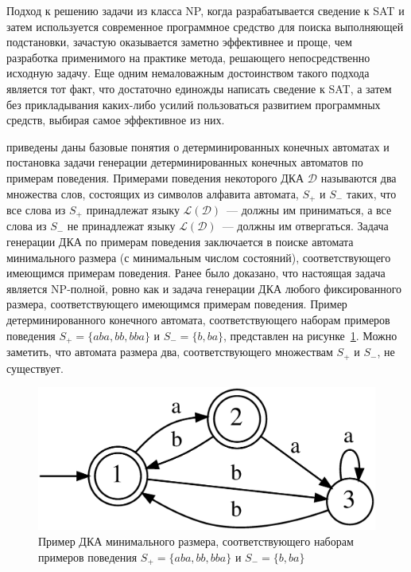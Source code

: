 Подход к решению задачи из класса NP, когда разрабатывается сведение к SAT и затем используется современное программное средство для поиска выполняющей подстановки, зачастую оказывается заметно эффективнее и проще, чем разработка применимого на практике метода, решающего непосредственно исходную задачу.
Еще одним немаловажным достоинством такого подхода является тот факт, что достаточно единожды написать сведение к SAT, а затем без прикладывания каких-либо усилий пользоваться развитием программных средств, выбирая самое эффективное из них.

\insection{\ref{sec:review:dfa-inf}} приведены даны базовые понятия о детерминированных конечных автоматах и постановка задачи генерации детерминированных конечных автоматов по примерам поведения. 
Примерами поведения некоторого ДКА $\mathcal{D}$ называются два множества слов, состоящих из символов алфавита автомата, $S_{+}$ и $S_{-}$ таких, что все слова из $S_{+}$ принадлежат языку $\mathcal{L}\left(\mathcal{D}\right)$~--- должны им приниматься, а все слова из $S_{-}$ не принадлежат языку $\mathcal{L}\left(\mathcal{D}\right)$~--- должны им отвергаться.
Задача генерации ДКА по примерам поведения заключается в поиске автомата минимального размера (с минимальным числом состояний), соответствующего имеющимся примерам поведения.
Ранее было доказано, что настоящая задача является NP-полной, ровно как и задача генерации ДКА любого фиксированного размера, соответствующего имеющимся примерам поведения.
Пример детерминированного конечного автомата, соответствующего наборам примеров поведения $S_{+} = \{aba, bb, bba\}$ и $S_{-} = \{b, ba\}$, представлен на рисунке~\ref{syn:img:dfa-ex}.
Можно заметить, что автомата размера два, соответствующего множествам $S_{+}$ и $S_{-}$, не существует.

\begin{figure}[ht]
  \centering
  \includegraphics[scale=0.16]{img/datamod/FIG1.eps}
  \caption{Пример ДКА минимального размера, соответствующего наборам примеров поведения $S_{+} = \{aba, bb, bba\}$ и $S_{-} = \{b, ba\}$}
  \label{syn:img:dfa-ex}
\end{figure}


